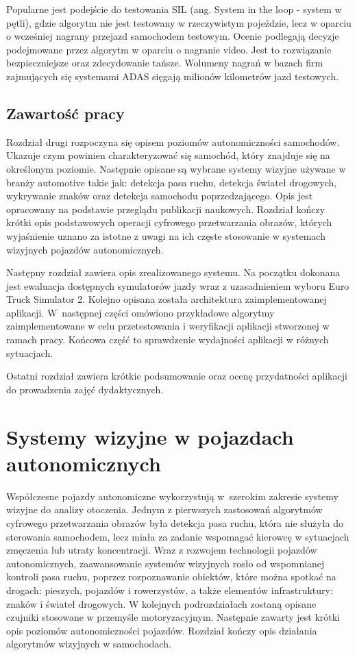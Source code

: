 Popularne jest podejście do testowania SIL (ang. System in the loop - system w pętli), gdzie algorytm nie jest testowany w rzeczywistym pojeździe, lecz w oparciu o wcześniej nagrany przejazd samochodem testowym. Ocenie podlegają decyzje podejmowane przez algorytm w oparciu o nagranie video. Jest to rozwiązanie bezpieczniejsze oraz zdecydowanie tańsze. Wolumeny nagrań w bazach firm zajmujących się systemami ADAS sięgają milionów kilometrów jazd testowych.

\section{Zawartość pracy}

Rozdział drugi rozpoczyna się opisem poziomów autonomiczności samochodów. 
Ukazuje czym powinien charakteryzować się samochód, który znajduje się na określonym poziomie.
Następnie opisane są wybrane systemy wizyjne używane w branży automotive takie jak: detekcja pasa ruchu, detekcja świateł drogowych, wykrywanie znaków oraz detekcja samochodu poprzedzającego.
Opis jest opracowany na podstawie przeglądu publikacji naukowych.
Rozdział kończy krótki opis podstawowych operacji cyfrowego przetwarzania obrazów, których wyjaśnienie uznano za istotne z uwagi na ich częste stosowanie w systemach wizyjnych pojazdów autonomicznych.

Następny rozdział zawiera opis zrealizowanego systemu. 
Na początku dokonana jest ewaluacja dostępnych symulatorów jazdy wraz z uzasadnieniem wyboru Euro Truck Simulator 2. 
Kolejno opisana została architektura zaimplementowanej aplikacji. 
W~następnej części omówiono przykładowe algorytmy zaimplementowane w celu przetestowania i weryfikacji aplikacji stworzonej w ramach pracy. 
Końcowa część to sprawdzenie wydajności aplikacji w różnych sytuacjach.

Ostatni rozdział zawiera krótkie podsumowanie oraz ocenę przydatności aplikacji do prowadzenia zajęć dydaktycznych.

\chapter{Systemy wizyjne w pojazdach autonomicznych}

Współczesne pojazdy autonomiczne wykorzystują w~szerokim zakresie systemy wizyjne do analizy otoczenia. 
Jednym z pierwszych zastosowań algorytmów cyfrowego przetwarzania obrazów była detekcja pasa ruchu, która nie służyła do sterowania samochodem, lecz miała za zadanie wspomagać kierowcę w sytuacjach zmęczenia lub utraty koncentracji. 
Wraz z rozwojem technologii pojazdów autonomicznych, zaawansowanie systemów wizyjnych rosło od wspomnianej kontroli pasa ruchu, poprzez rozpoznawanie obiektów, które można spotkać na drogach: pieszych, pojazdów i rowerzystów, a także elementów infrastruktury: znaków i świateł drogowych.
W kolejnych podrozdziałach zostaną opisane czujniki stosowane w przemyśle motoryzacyjnym. Następnie zawarty jest krótki opis poziomów autonomiczności pojazdów. Rozdział kończy opis działania algorytmów wizyjnych w samochodach.

